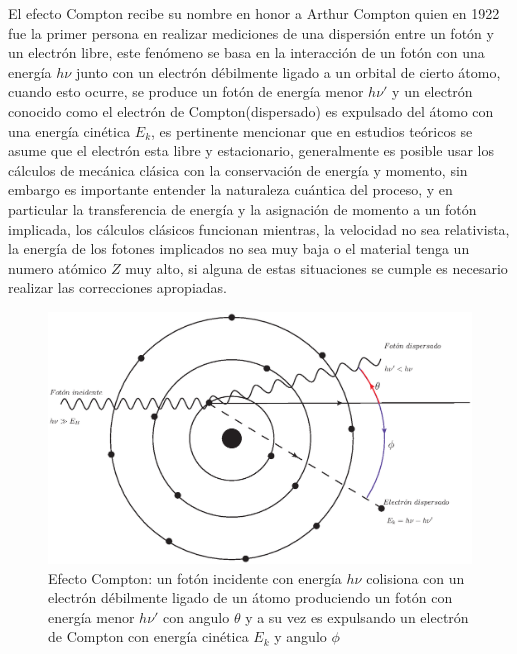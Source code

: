 El efecto Compton recibe su nombre en honor a Arthur Compton quien en 1922 fue la primer persona en realizar mediciones de una dispersión entre un fotón y un electrón libre, este fenómeno se basa en la interacción de un fotón con una energía $h\nu$ junto con un electrón débilmente ligado a un orbital de cierto átomo, cuando esto ocurre, se produce un fotón de energía menor $h\nu '$ y un electrón conocido como el electrón de Compton(dispersado) es expulsado del átomo con una energía cinética $E_k$, es pertinente mencionar que en estudios teóricos se asume que el electrón esta libre y estacionario\cite{Podgorsak}, generalmente es posible usar los cálculos de mecánica clásica con la conservación de energía y momento, sin embargo es importante entender la naturaleza cuántica del proceso, y en particular la transferencia de energía y la asignación de momento a un fotón implicada, los cálculos clásicos funcionan mientras, la velocidad no sea relativista, la energía de los fotones implicados no sea muy baja o el material tenga un numero atómico $Z$ muy alto, si alguna de estas situaciones se cumple es necesario realizar las correcciones apropiadas\cite{Edward}.\\
\begin{figure}[htbp]
    \centering
    \includegraphics[width=.71\linewidth]{./Figures/compton1.eps}
    \caption[Efecto Compton]{Efecto Compton: un fotón incidente con energía $h\nu$ colisiona con un electrón débilmente ligado de un átomo produciendo un fotón con energía menor $h\nu '$ con angulo $\theta$ y a su vez es expulsando un electrón de Compton con energía cinética $E_k$ y angulo $\phi$}
    \label{fig:Compton}
\end{figure}


